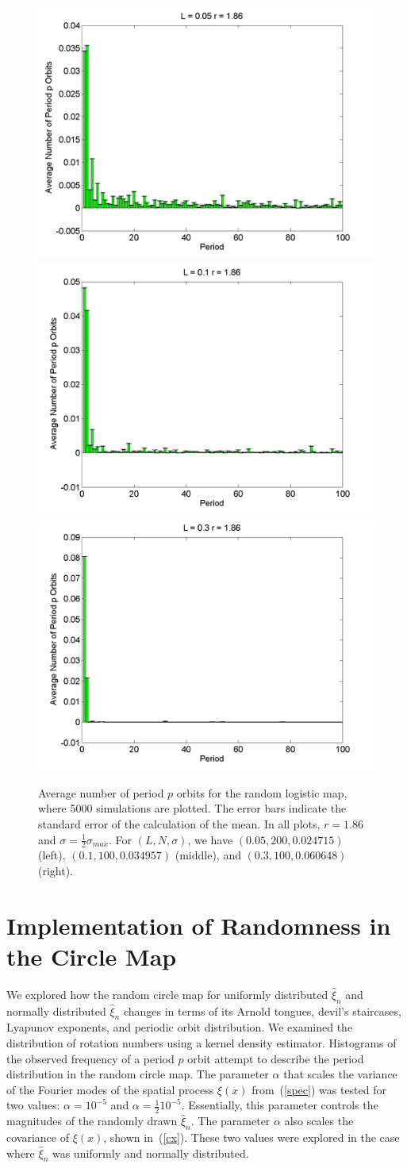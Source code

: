 \begin{figure}[H]\linespread{1}
\caption[Average number of period $p$ orbits for the random logistic
map, $\sigma=\frac{1}{2}\sigma_{max}$ and $r=1.86$]{Average number of period $p$ orbits for the random logistic
map, where 5000 simulations are plotted. The error bars indicate
the standard error of the calculation of the mean. In all plots,
$r=1.86$ and $\sigma=\frac{1}{2}\sigma_{max}$. For $(L,N,\sigma)$,
we have $(0.05, 200, 0.024715)$ (left), $(0.1, 100, 0.034957)$
(middle), and $(0.3, 100, 0.060648)$ (right).}\label{fig:rloghist2_hs}
	\begin{center}	\includegraphics[width=.33\textwidth]{figs/rlog_hist_hs_L_005_r_186_s_0024715_a_15267e-05_sims_5000.png}\hfill
\includegraphics[width=.33\textwidth]{figs/rlog_hist_hs_L_01_r_186_s_0034957_a_6105e-05_sims_5000.png}\hfill	
\includegraphics[width=.33\textwidth]{figs/rlog_hist_hs_L_03_r_186_s_0060648_a_000054762_sims_5000.png}
	\end{center}
\end{figure}

\section{Implementation of Randomness in the Circle Map}
We explored how the random circle map for uniformly distributed $\hat{\xi}_n$ and
normally distributed $\hat{\xi}_n$ changes in terms of its Arnold
tongues, devil's staircases, Lyapunov exponents, and periodic orbit distribution. We examined the
distribution of rotation numbers using a kernel density
estimator. Histograms of the observed frequency of a period $p$ orbit
attempt to describe the period distribution in the random circle
map. The parameter $\alpha$ that scales the variance of the Fourier
modes of the spatial process $\xi(x)$ from~(\ref{spec}) was tested for two values: $\alpha=10^{-5}$
and $\alpha = \frac{1}{2}10^{-5}$. Essentially, this parameter controls
the magnitudes of the randomly drawn $\hat{\xi}_n$. The parameter $\alpha$ also scales the
covariance of $\xi(x)$, shown in~(\ref{cx}). These two values were explored in
the case where $\hat{\xi}_n$ was uniformly and normally distributed.


